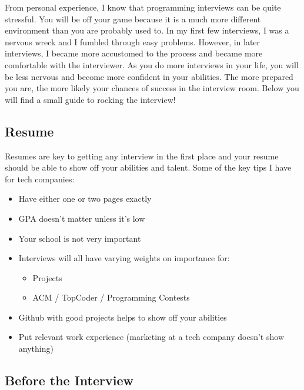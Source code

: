 \documentclass[11pt,oneside]{book}
\begin{document}
From personal experience, I know that programming interviews can be quite stressful. 
    You will be off your game because it is a much more different environment than 
    you are probably used to. In my first few interviews, I was a nervous wreck and I fumbled
    through easy problems.
    However, in later interviews, I became more accustomed to the process and became more 
    comfortable with the interviewer. As you do more interviews in your life, you will be
    less nervous and become more confident in your abilities. The more prepared you are, the 
    more likely your chances of success in the interview room. Below you will find a small guide
    to rocking the interview!

\subsection{Resume}

Resumes are key to getting any interview in the first place and your resume should be able to show off your abilities and talent. Some of the key tips I have for tech companies:

\begin{itemize}
\item Have either one or two pages exactly
\item GPA doesn't matter unless it's low
\item Your school is not very important
\item Interviews will all have varying weights on importance for:

\begin{itemize}
\item Projects
\item ACM / TopCoder / Programming Contests
\end{itemize}
\item Github with good projects helps to show off your abilities
\item Put relevant work experience (marketing at a tech company doesn't show anything)
\end{itemize}

\subsection{Before the Interview}
\end{document}
